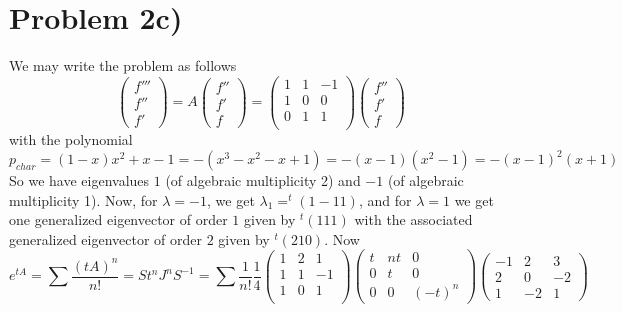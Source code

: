 \section*{Problem 2c)} 
We may write the problem as follows
\[ \begin{pmatrix}
f'''\\f''\\f'
\end{pmatrix} = A\begin{pmatrix}
f''\\f'\\f
\end{pmatrix}=\begin{pmatrix}
1&1&-1\\
1&0&0\\
0&1&1\\
\end{pmatrix}\begin{pmatrix}
f''\\f'\\f
\end{pmatrix}\]
with the polynomial
\[ p_{char} = (1-x)x^2 + x - 1  = -(x^3-x^2-x+1) = -(x-1)(x^2-1) = -(x-1)^2(x+1) \]
So we have eigenvalues $1$ (of algebraic multiplicity 2) and $-1$ (of algebraic multiplicity 1). Now, for $\lambda = -1$, we get $\lambda_1 = ^t(1 -1 1)$, and for $\lambda=1$ we get one generalized eigenvector of order $1$ given by $^t(1 1 1)$ with the associated generalized eigenvector of order $2$ given by $^t(2 1 0)$. 
Now 
\[ e^{tA} = \sum \frac{(tA)^n}{n!} = S t^n J^n S^{-1} = \sum \frac{1}{n!}\frac{1}{4}\begin{pmatrix}
1&2&1\\
1&1&-1\\
1&0&1\\
\end{pmatrix}\begin{pmatrix}
t&nt&0\\
0&t&0\\
0&0&(-t)^n
\end{pmatrix}\begin{pmatrix}
-1&2&3\\
2&0&-2\\
1&-2&1
\end{pmatrix} \]
